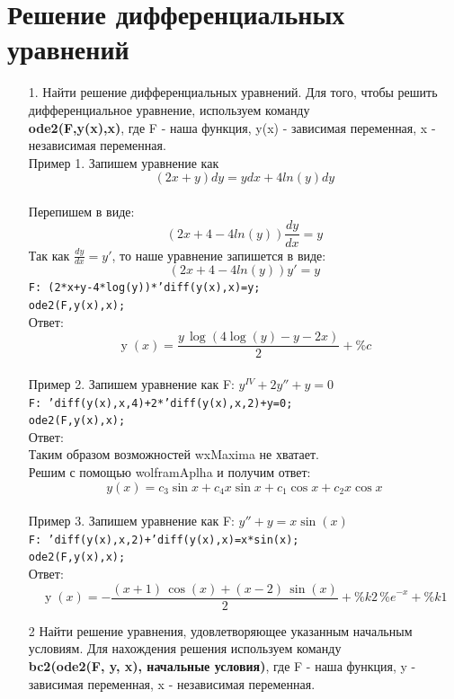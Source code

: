 \documentclass[article, bachelor, och, pract]{SCWorks}
\begin{document}
\section{Решение дифференциальных уравнений}
\begin{itemize}
\item[1.] Найти решение дифференциальных уравнений. Для того, чтобы решить дифференциальное уравнение, используем команду\\
\textbf{ode2(F,y(x),x)}, где F - наша функция, y(x) - зависимая переменная, x - независимая переменная.\\

Пример 1. Запишем уравнение как $$(2x+y)dy = ydx +4ln(y)dy$$\\
Перепишем в виде: $$(2x+4-4ln(y))\frac{dy}{dx}=y$$
Так как $\frac{dy}{dx} = y'$, то наше уравнение запишется в виде:
$$(2x+4-4ln(y))y'=y$$
\texttt{F: (2*x+y-4*log(y))*'diff(y(x),x)=y;}\\
\texttt{ode2(F,y(x),x);}\\
Ответ: \[\operatorname{y}(x)=\frac{y\,\log{\left( 4\log{(y)}-y-2x\right) }}{2}+\mathit{\%{}c}\]
\\
Пример 2. Запишем уравнение как F: $y^{IV}+2y''+y=0$\\
\texttt{F: 'diff(y(x),x,4)+2*'diff(y(x),x,2)+y=0;}\\
\texttt{ode2(F,y(x),x);}\\
Ответ: \\
Таким образом возможностей wxMaxima не хватает.\\
Решим с помощью wolframAplha и получим ответ:
$$y(x) = c_3 \sin{x}+c_4 x \sin{x}+c_1 \cos{x}+c_2 x \cos{x}$$\\
Пример 3. Запишем уравнение как F: $y''+y=x\sin(x) $\\
\texttt{F: 'diff(y(x),x,2)+'diff(y(x),x)=x*sin(x);}\\
\texttt{ode2(F,y(x),x);}\\
Ответ: \[\operatorname{y}(x)=-\frac{\left( x+1\right) \,\cos{(x)}+\left( x-2\right) \,\sin{(x)}}{2}+\mathit{\%{}k2}\,{{\%{}e}^{-x}}+\mathit{\%{}k1}\]

\item[2] Найти решение уравнения, удовлетворяющее указанным начальным условиям. Для нахождения решения используем команду \\ \textbf{bc2(ode2(F, y, x), начальные условия)}, где F - наша функция, y - зависимая переменная, x - независимая переменная.


\end{itemize}
\end{document}
